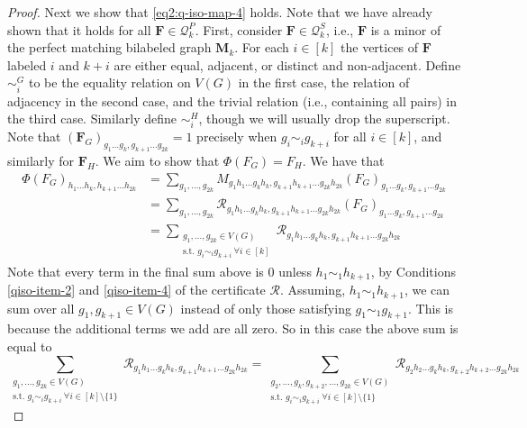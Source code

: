 \documentclass[a4paper,onecolumn,11pt,accepted=2026-01-06]{quantumarticle}
\theoremstyle{plain}
\theoremstyle{remark}
\theoremstyle{definition}
\begin{document}
\begin{proof}
    Next we show that \eqref{eq2:q-iso-map-4} holds. Note that we have already shown that it holds for all $\boldsymbol{F} \in \mathcal{Q}_k^P$. First, consider $\boldsymbol{F} \in \mathcal{Q}_k^S$, i.e., $\boldsymbol{F}$ is a minor of the perfect matching bilabeled graph $\boldsymbol{M}_k$. For each $i \in [k]$ the vertices of $\boldsymbol{F}$ labeled $i$ and $k+i$ are either equal, adjacent, or distinct and non-adjacent. Define $\sim^G_i$ to be the equality relation on $V(G)$ in the first case, the relation of adjacency in the second case, and the trivial relation (i.e., containing all pairs) in the third case. Similarly define $\sim_i^H$, though we will usually drop the superscript. Note that $(\boldsymbol{F}_G)_{g_1\ldots g_k,g_{k+1}\ldots g_{2k}} = 1$ precisely when $g_i \sim_i g_{k+i}$ for all $i \in [k]$, and similarly for $\boldsymbol{F}_H$. We aim to show that $\Phi(F_G) = F_H$. We have that
    \begin{align}
        \Phi(F_G)_{h_1\ldots h_k,h_{k+1}\ldots h_{2k}} &= \sum_{g_1, \ldots, g_{2k}} M_{g_1h_1\ldots g_kh_k,g_{k+1}h_{k+1}\ldots g_{2k}h_{2k}} (F_G)_{g_1\ldots g_k, g_{k+1}\ldots g_{2k}} \\
        &= \sum_{g_1, \ldots, g_{2k}} \mathcal{R}_{g_1h_1\ldots g_kh_k,g_{k+1}h_{k+1}\ldots g_{2k}h_{2k}} (F_G)_{g_1\ldots g_k, g_{k+1}\ldots g_{2k}}\\
        &= \sum_{\substack{g_1, \ldots, g_{2k} \in V(G) \\ \text{s.t. } g_i \sim_i g_{k+i} \ \forall i \in [k]}} \mathcal{R}_{g_1h_1\ldots g_kh_k,g_{k+1}h_{k+1}\ldots g_{2k}h_{2k}}
    \end{align}
Note that every term in the final sum above is 0 unless $h_1 \sim_1 h_{k+1}$, by Conditions \ref{qiso-item-2} and \ref{qiso-item-4} of the certificate $\mathcal{R}$. Assuming, $h_1 \sim_1 h_{k+1}$, we can sum over all $g_1, g_{k+1} \in V(G)$ instead of only those satisfying $g_1 \sim_1 g_{k+1}$. This is because the additional terms we add are all zero. So in this case the above sum is equal to
\begin{equation}
    \sum_{\substack{g_1, \ldots, g_{2k} \in V(G) \\ \text{s.t. } g_i \sim_i g_{k+i} \ \forall i \in [k]\setminus \{1\}}} \mathcal{R}_{g_1h_1\ldots g_kh_k,g_{k+1}h_{k+1}\ldots g_{2k}h_{2k}} = \sum_{\substack{g_2, \ldots, g_{k}, g_{k+2}, \ldots, g_{2k} \in V(G) \\ \text{s.t. } g_i \sim_i g_{k+i} \ \forall i \in [k]\setminus \{1\}}} \mathcal{R}_{g_2h_2\ldots g_kh_k,g_{k+2}h_{k+2}\ldots g_{2k}h_{2k}}

\end{equation}
\end{proof}
\end{document}
